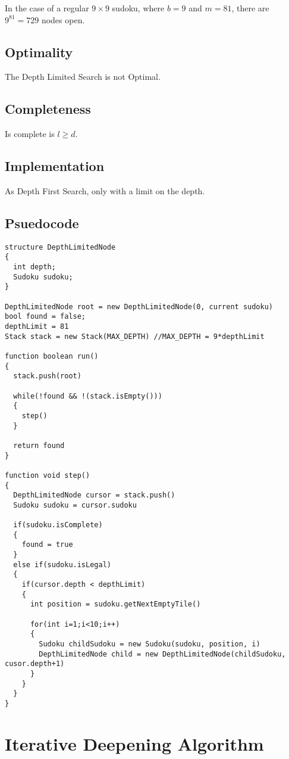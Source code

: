 \documentclass[10pt,letterpaper]{article}
\begin{document}
      In the case of a regular \(9\times 9\) sudoku, where  \(b = 9\) and \(m = 81\), there are \(9^{81} = 729\) nodes open.
      
    \subsection{Optimality}
      The Depth Limited Search is not Optimal.
    
    \subsection{Completeness}
      Is complete is \(l \geq d\).
      
    \subsection{Implementation}
      As Depth First Search, only with a limit on the depth.
      
    \newpage
    \subsection{Psuedocode}
      \begin{verbatim}
structure DepthLimitedNode
{
  int depth;
  Sudoku sudoku;
}

DepthLimitedNode root = new DepthLimitedNode(0, current sudoku)
bool found = false;
depthLimit = 81
Stack stack = new Stack(MAX_DEPTH) //MAX_DEPTH = 9*depthLimit

function boolean run()
{
  stack.push(root)
  
  while(!found && !(stack.isEmpty()))
  {
    step()
  }
  
  return found
}

function void step()
{
  DepthLimitedNode cursor = stack.push()
  Sudoku sudoku = cursor.sudoku
  
  if(sudoku.isComplete)
  {
    found = true
  }
  else if(sudoku.isLegal)
  {
    if(cursor.depth < depthLimit)
    {
      int position = sudoku.getNextEmptyTile()
      
      for(int i=1;i<10;i++)
      {
        Sudoku childSudoku = new Sudoku(sudoku, position, i)
        DepthLimitedNode child = new DepthLimitedNode(childSudoku, cusor.depth+1)
      }
    }
  }
}
      \end{verbatim}
      
  \newpage
  \section{Iterative Deepening Algorithm}
\end{document}
